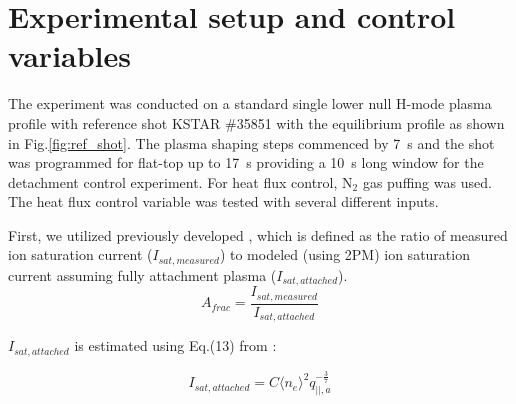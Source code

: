 

\section{Experimental setup and control variables}
\label{sec:control_variables}



The experiment was conducted on a standard single lower null H-mode plasma profile with reference shot KSTAR \#35851 with the equilibrium profile as shown in Fig.\ref{fig:ref_shot}.
The plasma shaping steps commenced by 7~s and the shot was programmed for flat-top up to 17~s providing a 10~s long window for the detachment control experiment.
For heat flux control, N$_2$ gas puffing was used.
The heat flux control variable was tested with several different inputs.

First, we utilized previously developed \Afrac\cite{Eldon_2022_PPCF}, which is defined as the ratio of measured ion saturation current ($I_{sat, measured}$) to modeled (using 2PM\cite{Leonard_2018_PPCF}) ion saturation current assuming fully attachment plasma ($I_{sat, attached}$).
\begin{equation}
    A_{frac} = \frac{I_{sat, measured}}{I_{sat, attached}}
\end{equation}

$I_{sat, attached}$ is estimated using Eq.(13) from \cite{Eldon_2022_PPCF}:

\begin{equation}
    I_{sat, attached} = C \langle n_{e} \rangle^2 q_{||, a}^{-\frac{3}{7}} 
\end{equation}

